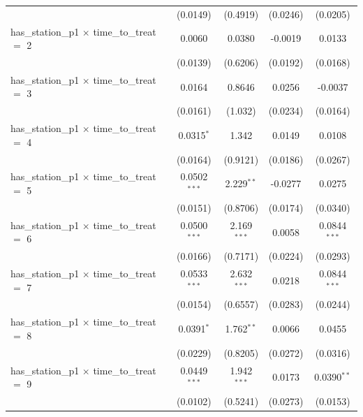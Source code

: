 \documentclass[A4paper,12pt]{article}
\begin{document}
\begin{appendices}
\begin{table}[ht]
{\begin{tabular}{lcccc}
                                                         & (0.0149)       & (0.4919)      & (0.0246) & (0.0205)\\   
   has\_station\_p1 $\times$ time\_to\_treat $=$ 2       & 0.0060         & 0.0380        & -0.0019  & 0.0133\\   
                                                         & (0.0139)       & (0.6206)      & (0.0192) & (0.0168)\\   
   has\_station\_p1 $\times$ time\_to\_treat $=$ 3       & 0.0164         & 0.8646        & 0.0256   & -0.0037\\   
                                                         & (0.0161)       & (1.032)       & (0.0234) & (0.0164)\\   
   has\_station\_p1 $\times$ time\_to\_treat $=$ 4       & 0.0315$^{*}$   & 1.342         & 0.0149   & 0.0108\\   
                                                         & (0.0164)       & (0.9121)      & (0.0186) & (0.0267)\\   
   has\_station\_p1 $\times$ time\_to\_treat $=$ 5       & 0.0502$^{***}$ & 2.229$^{**}$  & -0.0277  & 0.0275\\   
                                                         & (0.0151)       & (0.8706)      & (0.0174) & (0.0340)\\   
   has\_station\_p1 $\times$ time\_to\_treat $=$ 6       & 0.0500$^{***}$ & 2.169$^{***}$ & 0.0058   & 0.0844$^{***}$\\   
                                                         & (0.0166)       & (0.7171)      & (0.0224) & (0.0293)\\   
   has\_station\_p1 $\times$ time\_to\_treat $=$ 7       & 0.0533$^{***}$ & 2.632$^{***}$ & 0.0218   & 0.0844$^{***}$\\   
                                                         & (0.0154)       & (0.6557)      & (0.0283) & (0.0244)\\   
   has\_station\_p1 $\times$ time\_to\_treat $=$ 8       & 0.0391$^{*}$   & 1.762$^{**}$  & 0.0066   & 0.0455\\   
                                                         & (0.0229)       & (0.8205)      & (0.0272) & (0.0316)\\   
   has\_station\_p1 $\times$ time\_to\_treat $=$ 9       & 0.0449$^{***}$ & 1.942$^{***}$ & 0.0173   & 0.0390$^{**}$\\   
                                                         & (0.0102)       & (0.5241)      & (0.0273) & (0.0153)\\   

\end{tabular}}
\end{table}
\end{appendices}
\end{document}
